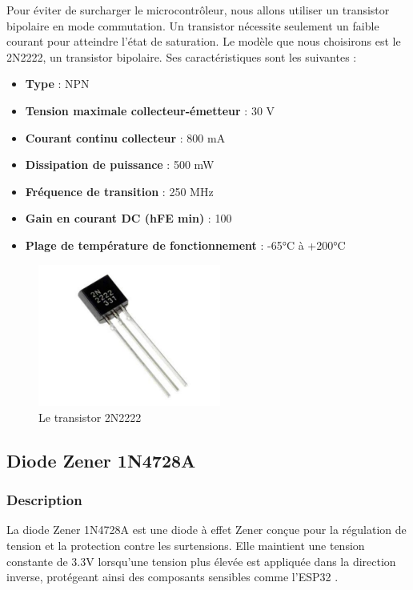 	Pour éviter de surcharger le microcontrôleur, nous allons utiliser un transistor bipolaire en mode commutation. Un transistor nécessite seulement un faible courant pour atteindre l'état de saturation. Le modèle que nous choisirons est le 2N2222, un transistor bipolaire. Ses caractéristiques sont les suivantes \cite{9}:
	
\begin{itemize}[label={--}]
	\item \textbf{Type} : NPN
	\item \textbf{Tension maximale collecteur-émetteur} : 30 V
	\item \textbf{Courant continu collecteur} : 800 mA
	\item \textbf{Dissipation de puissance} : 500 mW
	\item \textbf{Fréquence de transition} : 250 MHz
	\item \textbf{Gain en courant DC (hFE min)} : 100
	\item \textbf{Plage de température de fonctionnement} : -65°C à +200°C
\end{itemize}
\begin{figure}[H]
	\centering
	\includegraphics[width=6cm]{./img/composants/2n2222.png}
	\caption{Le transistor 2N2222}
	\label{fig:relais_5vdc}
\end{figure}
\subsection{Diode Zener 1N4728A}

\subsubsection*{Description}
La diode Zener 1N4728A est une diode à effet Zener conçue pour la régulation de tension et la protection contre les surtensions. Elle maintient une tension constante de 3.3V lorsqu'une tension plus élevée est appliquée dans la direction inverse, protégeant ainsi des composants sensibles comme l'ESP32 \cite{4}.

